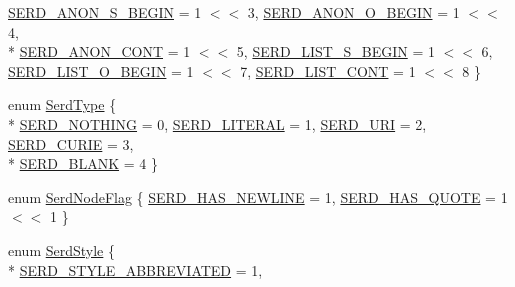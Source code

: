 \begin{DoxyCompactItemize}
\hyperlink{group__serd_gga9f7ab02c389af900f04d29be09c57647a4884dff61b0d7db44be17bb950158f8e}{S\+E\+R\+D\+\_\+\+A\+N\+O\+N\+\_\+\+S\+\_\+\+B\+E\+G\+IN} = 1 $<$$<$ 3, 
\hyperlink{group__serd_gga9f7ab02c389af900f04d29be09c57647aae52aa2d821bdd02e828cfcf07692978}{S\+E\+R\+D\+\_\+\+A\+N\+O\+N\+\_\+\+O\+\_\+\+B\+E\+G\+IN} = 1 $<$$<$ 4, 
\\*
\hyperlink{group__serd_gga9f7ab02c389af900f04d29be09c57647ac4825dca7b59b50762a87174fc4148b2}{S\+E\+R\+D\+\_\+\+A\+N\+O\+N\+\_\+\+C\+O\+NT} = 1 $<$$<$ 5, 
\hyperlink{group__serd_gga9f7ab02c389af900f04d29be09c57647ada6665ea768d1fa37766c7a9b5e38d2f}{S\+E\+R\+D\+\_\+\+L\+I\+S\+T\+\_\+\+S\+\_\+\+B\+E\+G\+IN} = 1 $<$$<$ 6, 
\hyperlink{group__serd_gga9f7ab02c389af900f04d29be09c57647a546d2b47940fe7e7fcf866dcb278788d}{S\+E\+R\+D\+\_\+\+L\+I\+S\+T\+\_\+\+O\+\_\+\+B\+E\+G\+IN} = 1 $<$$<$ 7, 
\hyperlink{group__serd_gga9f7ab02c389af900f04d29be09c57647a0d0a1d37007f3e9524ad05fb42fee24a}{S\+E\+R\+D\+\_\+\+L\+I\+S\+T\+\_\+\+C\+O\+NT} = 1 $<$$<$ 8
 \}
\item 
enum \hyperlink{group__serd_ga7ccd8d4fb2c3a6ad690ed6d6fe1b45fa}{Serd\+Type} \{ \\*
\hyperlink{group__serd_gga7ccd8d4fb2c3a6ad690ed6d6fe1b45faa028984ec3afe86cc5acc79df3b279b28}{S\+E\+R\+D\+\_\+\+N\+O\+T\+H\+I\+NG} = 0, 
\hyperlink{group__serd_gga7ccd8d4fb2c3a6ad690ed6d6fe1b45faaa661a7e84228e32f0b979839658bf4c6}{S\+E\+R\+D\+\_\+\+L\+I\+T\+E\+R\+AL} = 1, 
\hyperlink{group__serd_gga7ccd8d4fb2c3a6ad690ed6d6fe1b45faa7c01ef6de89d3245d4aed20da0736d24}{S\+E\+R\+D\+\_\+\+U\+RI} = 2, 
\hyperlink{group__serd_gga7ccd8d4fb2c3a6ad690ed6d6fe1b45faa8a72fff2f6f94adeb11ccadf12c117d8}{S\+E\+R\+D\+\_\+\+C\+U\+R\+IE} = 3, 
\\*
\hyperlink{group__serd_gga7ccd8d4fb2c3a6ad690ed6d6fe1b45faaed82589a7355a2086b1c9cd91ec261c7}{S\+E\+R\+D\+\_\+\+B\+L\+A\+NK} = 4
 \}
\item 
enum \hyperlink{group__serd_gaf4ef160dcb28ebf5786dfd138807d8b5}{Serd\+Node\+Flag} \{ \hyperlink{group__serd_ggaf4ef160dcb28ebf5786dfd138807d8b5adfeaf2c1a43d47c219474095fbba2a5a}{S\+E\+R\+D\+\_\+\+H\+A\+S\+\_\+\+N\+E\+W\+L\+I\+NE} = 1, 
\hyperlink{group__serd_ggaf4ef160dcb28ebf5786dfd138807d8b5ac3f09d734dd3ec4325e7b2f1c4bfdaca}{S\+E\+R\+D\+\_\+\+H\+A\+S\+\_\+\+Q\+U\+O\+TE} = 1 $<$$<$ 1
 \}
\item 
enum \hyperlink{group__serd_gae51da58ac1f1886c75ee2326495daeb2}{Serd\+Style} \{ \\*
\hyperlink{group__serd_ggae51da58ac1f1886c75ee2326495daeb2aa69f36bfcb18a88f514d5a763f8daaad}{S\+E\+R\+D\+\_\+\+S\+T\+Y\+L\+E\+\_\+\+A\+B\+B\+R\+E\+V\+I\+A\+T\+ED} = 1, 
$$
\end{DoxyCompactItemize}
